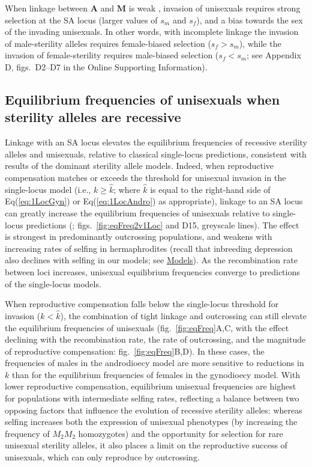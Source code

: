 \documentclass{article}
\newcommand\hl[1]{%
  \bgroup
  \hskip0pt\color{blue!80!black}%
  #1%
  \egroup
}
\begin{document}
\hl{When linkage between $\mathbf{A}$ and $\mathbf{M}$ is weak}, invasion of unisexuals requires strong selection at the SA locus (larger values of $s_m$ and $s_f$), and a bias towards the sex of the invading unisexuals. \hl{In other words,} with incomplete linkage the invasion of male-sterility alleles requires female-biased selection ($s_f > s_m$), while the invasion of female-sterility requires male-biased selection ($s_f < s_m$; see Appendix D, figs.~D2--D7 in the Online Supporting Information). 

\subsection*{Equilibrium frequencies of unisexuals when sterility alleles are recessive}

Linkage with an SA locus elevates the equilibrium frequencies of \hl{recessive sterility alleles and unisexuals, relative to classical single-locus predictions, consistent with results of the dominant sterility allele models. Indeed, when reproductive compensation matches or exceeds} the threshold for unisexual invasion in the single-locus model (i.e., $k \geq \hat{k}$; where $\hat{k}$ is equal to the right-hand side of Eq(\ref{eq:1LocGyn}) or Eq(\ref{eq:1LocAndro}) as appropriate), linkage \hl{to an SA locus can greatly increase the equilibrium frequencies of unisexuals relative to single-locus predictions} (\citealt{Charlesworth1978a}; figs.~\ref{fig:eqFreq2v1Loc} and D15, greyscale lines). The effect is strongest in predominantly outcrossing populations, and weakens with increasing rates of selfing in hermaphrodites (recall that inbreeding depression also declines with selfing in our models; see \hyperref[sec:Models]{Models}). As \hl{the recombination rate between loci increases,} unisexual equilibrium frequencies converge to predictions of the single-locus models.

When reproductive compensation falls below the single-locus threshold for invasion ($k < \hat{k}$), the combination of tight linkage and outcrossing can still elevate the equilibrium frequencies of unisexuals (fig.~\ref{fig:eqFreq}A,C, \hl{with the effect declining with the recombination rate, the rate of outcrossing, and the magnitude of reproductive compensation:} fig.~\ref{fig:eqFreq}B,D). In these cases, the frequencies of males in the androdioecy model are more sensitive to reductions in $k$ than for the equilibrium frequencies of females in the gynodioecy model. With lower reproductive compensation, equilibrium unisexual frequencies are highest for populations with intermediate selfing rates, reflecting a balance between two opposing factors that influence the evolution of recessive sterility alleles: \hl{whereas selfing increases both the expression of unisexual phenotypes (by increasing the frequency of $M_2 M_2$ homozygotes) and the opportunity for selection for rare unisexual sterility alleles, it also places a limit on the reproductive success of unisexuals, which can only reproduce by outcrossing.} 
\end{document}
